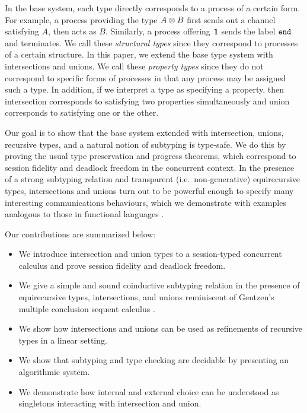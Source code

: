 \documentclass[a4paper,USenglish]{lipics-v2016}
\begin{document}
In the base system, each type directly corresponds to a process of a certain form. For example, a process providing the type $A \otimes B$ first sends out a channel satisfying $A$, then acts as $B$. Similarly, a process offering $\mathbf{1}$ sends the label $\texttt{end}$ and terminates. We call these \emph{structural types} since they correspond to processes of a certain structure. In this paper, we extend the base type system with intersections and unions. We call these \emph{property types} since they do not correspond to specific forms of processes in that any process may be assigned such a type. In addition, if we interpret a type as specifying a property, then intersection corresponds to satisfying two properties simultaneously and union corresponds to satisfying one or the other. 

Our goal is to show that the base system extended with intersection, unions, recursive types, and a natural notion of subtyping is type-safe. We do this by proving the usual type preservation and progress theorems, which correspond to session fidelity and deadlock freedom in the concurrent context. In the presence of a strong subtyping relation and transparent (i.e.\ non-generative)  equirecursive types, intersections and unions turn out to be powerful enough to specify many interesting communications behaviours, which we demonstrate with examples analogous to those in functional languages \cite{FreemanP91,Dunfield03fossacs}.

Our contributions are summarized below:
\begin{itemize}
  \item We introduce intersection and union types to a session-typed concurrent calculus and prove session fidelity and deadlock freedom.
  \item We give a simple and sound coinductive subtyping relation in the presence of equirecursive types, intersections, and unions reminiscent of Gentzen's multiple conclusion sequent calculus \cite{Gentzen35, Girard87}.
  \item We show how intersections and unions can be used as refinements of recursive types in a linear setting.
  \item We show that subtyping and type checking are decidable by presenting an algorithmic system.
  \item We demonstrate how internal and external choice can be understood as singletons interacting with intersection and union.
\end{itemize}
\end{document}
